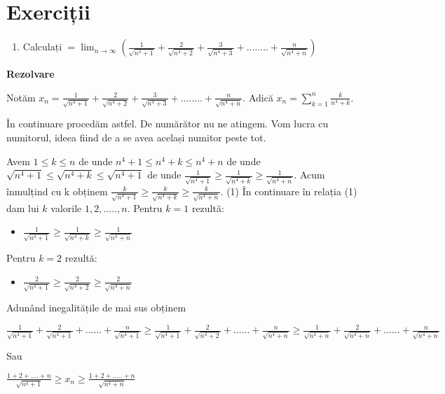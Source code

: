 \documentclass[a4paper,12pt,oneside]{report}
\begin{document}
\section{Exerciții}

\begin{enumerate}
  \item Calculați \( =\lim_{n\to\infty }\left ( \frac{1}{\sqrt{n^{4}+1}}+ \frac{2}{\sqrt{n^{4}+2} } +\frac{3}{\sqrt{n^{4}+3}}+........+\frac{n}{\sqrt{n^{4}+n}}  \right ) \)
\end{enumerate}

\textbf{Rezolvare}

Notăm \( x_{n}= \frac{1}{\sqrt{n^{4}+1}} + \frac{2}{\sqrt{n^{4}+2}}+\frac{3}{\sqrt{n^{4}+3}}+........+\frac{n}{\sqrt{n^{4}+n}} \).
Adică \( x_{n}= \sum_{k=1}^{n}\frac{k}{n^{4}+k}\).

În continuare procedăm astfel. De numărător nu ne atingem. Vom lucra cu numitorul, ideea fiind de a se avea același numitor peste tot. 

Avem \(1\leq k\leq n\) de unde \(n^{4}+1 \leq n^{4}+k \leq n^{4}+n\) de unde \(\sqrt{n^{4}+1}\leq \sqrt{n^{4}+k}\leq \sqrt{n^{4}+1}\) de unde \(\frac{1}{\sqrt{n^{4}+1}}\geq \frac{1}{\sqrt{n^{4}+k}}\geq \frac{1}{\sqrt{n^{4}+n}}\).
Acum înmulțind cu k obținem \(\frac{k}{\sqrt{n^{4}+1}}\geq \frac{k}{\sqrt{n^{4}+k}}\geq \frac{k}{\sqrt{n^{4}+n}}\). (1) 
În continuare în relația (1) dam lui \(k\) valorile \(1,2,.....,n\). 
Pentru \(k = 1\) rezultă:
\begin{itemize}
  \item \(\frac{1}{\sqrt{n^{4}+1}}\geq \frac{1}{\sqrt{n^{4}+k}}\geq \frac{1}{\sqrt{n^{4}+n}} \)
\end{itemize}

Pentru \(k = 2\) rezultă:
\begin{itemize}
  \item \(\frac{2}{\sqrt{n^{4}+1}}\geq \frac{2}{\sqrt{n^{4}+2}}\geq \frac{2}{\sqrt{n^{4}+n}} \)
\end{itemize}

Adunând inegalitățile de mai sus obținem 

\( \frac{1}{\sqrt{n^{4}+1}}+ \frac{2}{\sqrt{n^{4}+1}}+......+ \frac{n}{\sqrt{n^{4}+1}} \geq \frac{1}{\sqrt{n^{4}+1}}+ \frac{2}{\sqrt{n^{4}+2}}+......+ \frac{n}{\sqrt{n^{4}+n}}\geq \frac{1}{\sqrt{n^{4}+n}}+ \frac{2}{\sqrt{n^{4}+n}}+......+ \frac{n}{\sqrt{n^{4}+n}}\)

Sau

\(\frac{1+2+....+n}{\sqrt{n^{4}+1}}\geq x_{n}\geq \frac{1+2+.....+n}{\sqrt{n^{4}+n}}\)
\end{document}
